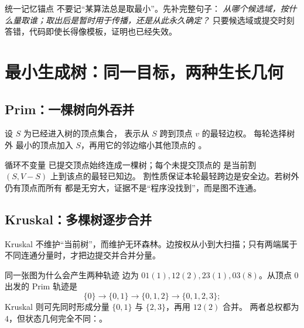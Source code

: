 \documentclass[UTF8,fontset=none,11pt,a4paper]{ctexart}
\begin{document}
\begin{corebox}{统一记忆锚点}
不要记“某算法总是取最小”。先补完整句子：
\emph{从哪个候选域，按什么量取谁；取出后是暂时用于传播，还是从此永久确定？}
只要候选域或提交时刻答错，代码即使长得像模板，证明也已经失效。
\end{corebox}

\section{最小生成树：同一目标，两种生长几何}

\subsection{Prim：一棵树向外吞并}
设 $S$ 为已经进入树的顶点集合， 表示从 $S$ 跨到顶点 $v$ 的最轻边权。
每轮选择树外  最小的顶点加入 $S$，再用它的邻边缩小其他顶点的 。

\begin{methodbox}{循环不变量}
已提交顶点始终连成一棵树；每个未提交顶点的  是当前割 $(S,V-S)$ 上到该点的最轻已知边。
割性质保证本轮最轻跨边是安全边。若树外仍有顶点而所有  都是无穷大，证据不是“程序没找到”，而是图不连通。
\end{methodbox}



\subsection{Kruskal：多棵树逐步合并}
Kruskal 不维护“当前树”，而维护无环森林。边按权从小到大扫描；只有两端属于不同连通分量时，才把边提交并合并分量。

\begin{examplebox}{同一张图为什么会产生两种轨迹}
边为 $01(1),12(2),23(1),03(8)$。从顶点 $0$ 出发的 Prim 轨迹是
\[
\{0\}\to\{0,1\}\to\{0,1,2\}\to\{0,1,2,3\};
\]
Kruskal 则可先同时形成分量 $\{0,1\}$ 与 $\{2,3\}$，再用 $12(2)$ 合并。
两者总权都为 $4$，但状态几何完全不同：。
\end{examplebox}


\end{document}
